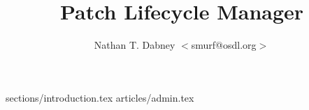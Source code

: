 \documentclass [twoside,12pt] {article}
\begin{document}
\title {Patch Lifecycle Manager}
\author {Nathan T. Dabney $<$smurf@osdl.org$>$}

\maketitle 
\tableofcontents

 {sections/introduction.tex}
 {articles/admin.tex}

\printindex
\end{document}
